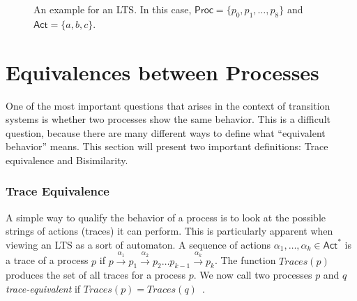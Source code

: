 \begin{figure}[tb]
\begin{center}
\end{center}
\caption{An example for an LTS\@. In this case,
    $\mathsf{Proc} = \{p_0, p_1, \ldots, p_8\}$ and
    $\mathsf{Act} = \{a, b, c\}$.
}%
\label{fig:example_lts}
\end{figure}


\section{Equivalences between Processes}

One of the most important questions that arises in the context of transition
systems is whether two processes show the same behavior.
This is a difficult question,
because there are many different ways to define
what \enquote{equivalent behavior} means.
This section will present two important definitions: Trace equivalence and
Bisimilarity.

\subsubsection{Trace Equivalence}

A simple way to qualify the behavior of a process is to look at the possible
strings of actions (traces) it can perform.
This is particularly apparent when viewing an LTS as a sort of automaton.
A sequence of actions $\alpha_1, \ldots, \alpha_k \in \mathsf{Act}^*$
is a trace of a process $p$ if
$p \xrightarrow{\alpha_1} p_1 \xrightarrow{\alpha_2} p_2
\ldots p_{k-1} \xrightarrow{\alpha_k} p_k$.
The function $Traces(p)$ produces the set of all traces for a process $p$.
We now call two processes $p$ and $q$ \emph{trace-equivalent}
if $Traces(p) = Traces(q)$~\cite{reactive_systems}.

